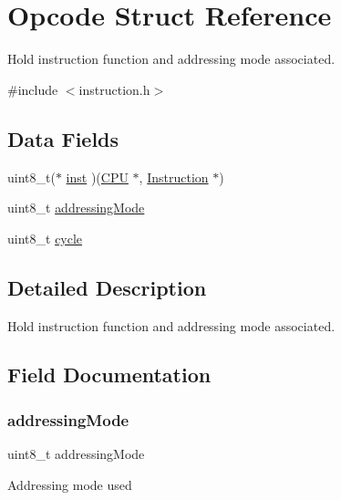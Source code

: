 \hypertarget{struct_opcode}{}\section{Opcode Struct Reference}
\label{struct_opcode}


Hold instruction function and addressing mode associated.  




{\ttfamily \#include $<$instruction.\+h$>$}

\subsection*{Data Fields}
\begin{DoxyCompactItemize}
\item 
uint8\+\_\+t($\ast$ \hyperlink{struct_opcode_aaac3f46611559561cb0430bdb8d0741d}{inst} )(\hyperlink{struct_c_p_u}{C\+PU} $\ast$, \hyperlink{struct_instruction}{Instruction} $\ast$)
\item 
uint8\+\_\+t \hyperlink{struct_opcode_af769224d4cd14a6d914fe7f7e3c8804f}{addressing\+Mode}
\item 
uint8\+\_\+t \hyperlink{struct_opcode_a43925d437f42c3541f76d1ef391476ca}{cycle}
\end{DoxyCompactItemize}


\subsection{Detailed Description}
Hold instruction function and addressing mode associated. 

\subsection{Field Documentation}
\mbox{\label{struct_opcode_af769224d4cd14a6d914fe7f7e3c8804f}} 
\subsubsection{\texorpdfstring{addressing\+Mode}{addressingMode}}
{\footnotesize\ttfamily uint8\+\_\+t addressing\+Mode}

Addressing mode used \mbox{\label{struct_opcode_a43925d437f42c3541f76d1ef391476ca}} 
